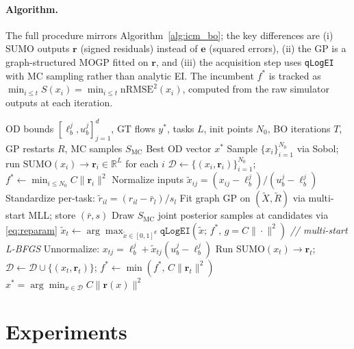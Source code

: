 \documentclass[11pt]{article}
\begin{document}
\paragraph{Algorithm.}
The full procedure mirrors Algorithm~\ref{alg:icm_bo}; the key differences are
(i) SUMO outputs $\mathbf{r}$ (signed residuals) instead of $\mathbf{e}$ (squared
errors), (ii) the GP is a graph-structured MOGP fitted on $\mathbf{r}$, and
(iii) the acquisition step uses \texttt{qLogEI} with MC sampling rather than analytic EI.
The incumbent $f^*$ is tracked as $\min_{i \leq t} S(x_i) = \min_{i \leq t}
\mathrm{nRMSE}^2(x_i)$, computed from the raw simulator outputs at each iteration.

\begin{algorithm}[t]
\caption{Signed-Residual Graph GP with \texttt{qLogEI} for OD Calibration}
\label{alg:signed-resid-bo}
\begin{algorithmic}[1]
\Require OD bounds $[\ell_b^j, u_b^j]_{j=1}^d$, GT flows $y^*$, tasks $L$,
         init points $N_0$, BO iterations $T$, GP restarts $R$,
         MC samples $S_{\mathrm{MC}}$
\Ensure Best OD vector $x^*$
\State Sample $\{x_i\}_{i=1}^{N_0}$ via Sobol; run $\mathrm{SUMO}(x_i) \to
       \mathbf{r}_i \in \mathbb{R}^L$ for each $i$
\State $\mathcal{D} \gets \{(x_i, \mathbf{r}_i)\}_{i=1}^{N_0}$;\quad
       $f^* \gets \min_{i \leq N_0} C\|\mathbf{r}_i\|^2$
  \State Normalize inputs $\tilde{x}_{ij} = (x_{ij} - \ell_b^j)/(u_b^j - \ell_b^j)$
  \State Standardize per-task: $\tilde{r}_{il} = (r_{il} - \bar{r}_l)/s_l$
  \State Fit graph GP on $(\tilde{X}, \tilde{R})$ via multi-start MLL; store $(\bar{r}, s)$
  \State Draw $S_{\mathrm{MC}}$ joint posterior samples at candidates via \eqref{eq:reparam}
  \State $\tilde{x}_t \gets \arg\max_{\tilde{x} \in [0,1]^d}
         \texttt{qLogEI}(\tilde{x};\, f^*,\, g = C\|\cdot\|^2)$
         \quad \textit{// multi-start L-BFGS}
  \State Unnormalize: $x_{tj} = \ell_b^j + \tilde{x}_{tj}(u_b^j - \ell_b^j)$
  \State Run $\mathrm{SUMO}(x_t) \to \mathbf{r}_t$;\quad
         $\mathcal{D} \gets \mathcal{D} \cup \{(x_t, \mathbf{r}_t)\}$;\quad
         $f^* \gets \min(f^*,\, C\|\mathbf{r}_t\|^2)$
\EndFor
\State \Return $x^* = \arg\min_{x \in \mathcal{D}} C\|\mathbf{r}(x)\|^2$
\end{algorithmic}
\end{algorithm}


\newpage

\section{Experiments}
\label{sec:experiments}
\end{document}
